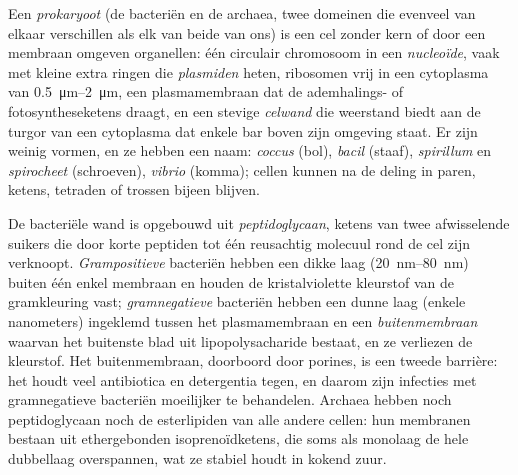 \begin{definition}\label{def:b2:unicellular-diversity:prokaryote}
Een \emph{prokaryoot} (de bacteriën en de archaea,
twee domeinen die evenveel van elkaar verschillen als elk van beide
van ons) is een cel zonder kern of door een membraan omgeven
organellen: één circulair chromosoom in een \emph{nucleoïde},
vaak met kleine extra ringen die \emph{plasmiden}
heten, ribosomen vrij in een cytoplasma van \qtyrange{0.5}{2}{\micro m},
een plasmamembraan dat de ademhalings- of fotosyntheseketens draagt,
en een stevige \emph{celwand} die weerstand
biedt aan de turgor van een cytoplasma dat enkele bar boven zijn
omgeving staat. Er zijn weinig vormen, en ze hebben een naam:
\emph{coccus} (bol), \emph{bacil} (staaf), \emph{spirillum} en
\emph{spirocheet} (schroeven), \emph{vibrio} (komma); cellen kunnen
na de deling in paren, ketens, tetraden of trossen bijeen blijven.
\end{definition}

\begin{proposition}\label{prop:b2:unicellular-diversity:gram}
De bacteriële wand is opgebouwd uit \emph{peptidoglycaan}, ketens van
twee afwisselende suikers die door korte peptiden tot één reusachtig
molecuul rond de cel zijn verknoopt. \emph{Grampositieve} bacteriën
hebben een dikke laag (\qtyrange{20}{80}{nm}) buiten één enkel
membraan en houden de kristalviolette kleurstof van de gramkleuring
vast; \emph{gramnegatieve} bacteriën hebben een dunne laag (enkele
nanometers) ingeklemd tussen het plasmamembraan en een \emph{buitenmembraan}
waarvan het buitenste blad uit lipopolysacharide bestaat, en ze
verliezen de kleurstof. Het buitenmembraan, doorboord door porines,
is een tweede barrière: het houdt veel antibiotica en detergentia
tegen, en daarom zijn infecties met gramnegatieve bacteriën moeilijker
te behandelen. Archaea hebben noch peptidoglycaan noch de
esterlipiden van alle andere cellen: hun membranen bestaan uit
ethergebonden isoprenoïdketens, die soms als monolaag de hele dubbellaag
overspannen, wat ze stabiel houdt in kokend zuur.
\end{proposition}

